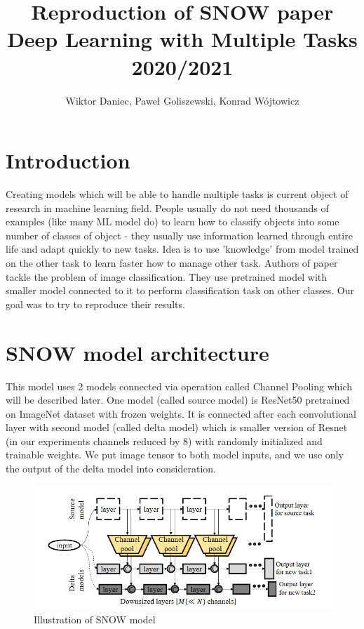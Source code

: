 \documentclass[12pt]{article}
\begin{document}
    \title{Reproduction of SNOW paper \\ \vspace{5mm} \large Deep Learning with Multiple Tasks 2020/2021}
    \author{Wiktor Daniec, Paweł Goliszewski, Konrad Wójtowicz}
    \date{}
    \maketitle


    \section{Introduction}

    Creating models which will be able to handle multiple tasks is current object of research in machine learning field.
    People usually do not need thousands of examples (like many ML model do) to learn how to classify objects into some number of classes of object - they usually use information learned through entire life and adapt quickly to new tasks.
    Idea is to use 'knowledge' from model trained on the other task to learn faster how to manage other task.
    Authors of paper \cite{paper} tackle the problem of image classification.
    They use pretrained model with smaller model connected to it to perform classification task on other classes.
    Our goal was to try to reproduce their results.


    \section{SNOW model architecture}

    This model uses 2 models connected via operation called Channel Pooling which will be described later.
    One model (called source model) is ResNet50 pretrained on ImageNet dataset with frozen weights.
    It is connected after each convolutional layer with second model (called delta model) which is smaller version of Resnet (in our experiments channels reduced by 8) with randomly initialized and trainable weights.
    We put image tensor to both model inputs, and we use only the output of the delta model into consideration.

    \begin{figure}
        \includegraphics{SNOW.png}
        \caption{Illustration of SNOW model}
    \end{figure}
\end{document}
